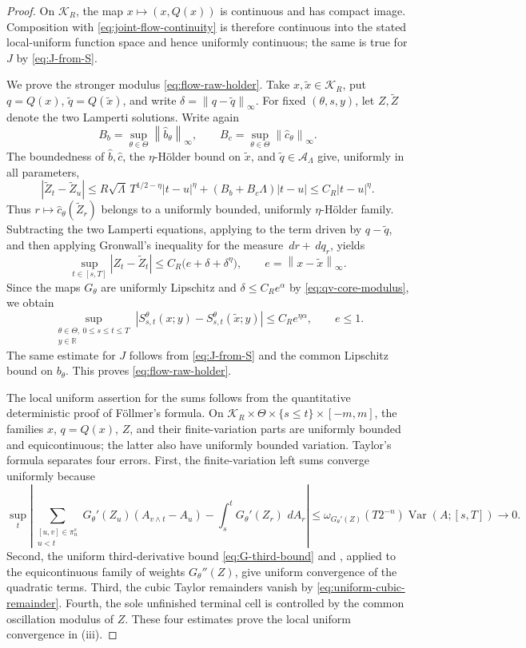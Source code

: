 \documentclass[10pt,a4paper]{amsart}
\newcommand{\R}{\mathbb R}
\newcommand{\Var}{\operatorname{Var}}
\newcommand{\abs}[1]{\left\lvert #1\right\rvert}
\newcommand{\cK}{\mathcal K}
\newcommand{\dd}{\,d}
\newcommand{\norm}[1]{\left\lVert #1\right\rVert}
\begin{document}
\begin{proof}
On \(\cK_R\), the map
\(x\mapsto(x,Q(x))\) is continuous and has compact image.  Composition with
\eqref{eq:joint-flow-continuity} is therefore continuous into the stated
local-uniform function space and hence uniformly continuous; the same is
true for \(J\) by \eqref{eq:J-from-S}.

We prove the stronger modulus \eqref{eq:flow-raw-holder}.  Take
\(x,\widetilde x\in\cK_R\), put
\(q=Q(x)\), \(\widetilde q=Q(\widetilde x)\), and write
\(\delta=\norm{q-\widetilde q}_\infty\).  For fixed
\((\theta,s,y)\), let \(Z,\widetilde Z\) denote the two Lamperti solutions.
Write again
\[
  B_b=\sup_{\theta\in\Theta}\norm{\widehat b_\theta}_\infty,
  \qquad
  B_c=\sup_{\theta\in\Theta}\norm{\widehat c_\theta}_\infty.
\]
The boundedness of \(\widehat b,\widehat c\), the \(\eta\)-H\"older bound on
\(\widetilde x\), and \(\widetilde q\in\mathcal A_\Lambda\) give, uniformly
in all parameters,
\[
  \abs{\widetilde Z_t-\widetilde Z_u}
  \le R\sqrt\Lambda\,T^{1/2-\eta}\abs{t-u}^\eta
      +(B_b+B_c\Lambda)\abs{t-u}
  \le C_R\abs{t-u}^\eta.
\]
Thus \(r\mapsto\widehat c_\theta(\widetilde Z_r)\) belongs to a uniformly
bounded, uniformly \(\eta\)-H\"older family.  Subtracting the two Lamperti
equations, applying  to the term driven by
\(q-\widetilde q\), and then applying Gronwall's inequality for the measure
\(\dd r+\dd q_r\), yields
\[
  \sup_{t\in[s,T]}\abs{Z_t-\widetilde Z_t}
  \le C_R\bigl(e+\delta+\delta^\eta\bigr),
  \qquad e=\norm{x-\widetilde x}_\infty.
\]
Since the maps \(G_\theta\) are uniformly Lipschitz and
\(\delta\le C_Re^\alpha\) by \eqref{eq:qv-core-modulus}, we obtain
\[
  \sup_{\substack{\theta\in\Theta,\ 0\le s\le t\le T\\y\in\R}}
  \abs{S_{s,t}^\theta(x;y)-S_{s,t}^\theta(\widetilde x;y)}
  \le C_Re^{\eta\alpha},
  \qquad e\le1.
\]
The same estimate for \(J\) follows from \eqref{eq:J-from-S} and the common
Lipschitz bound on \(b_\theta\).  This proves \eqref{eq:flow-raw-holder}.

The local uniform assertion for the sums follows
from the quantitative deterministic proof of F\"ollmer's formula.  On
\(\cK_R\times\Theta\times\{s\le t\}\times[-m,m]\), the families \(x\),
\(q=Q(x)\), \(Z\), and their finite-variation parts are uniformly bounded
and equicontinuous; the latter also have uniformly bounded variation.
Taylor's formula separates four errors.  First, the finite-variation left
sums converge uniformly because
\[
  \sup_t\left|
    \sum_{\substack{[u,v]\in\pi_n^s\\u<t}}
      G_\theta'(Z_u)(A_{v\wedge t}-A_u)
    -\int_s^tG_\theta'(Z_r)\,\dd A_r
  \right|
  \le
  \omega_{G_\theta'(Z)}(T2^{-n})\Var(A;[s,T])
  \longrightarrow0.
\]
Second, the uniform third-derivative bound
\eqref{eq:G-third-bound} and
, applied to the equicontinuous family of
weights \(G_\theta''(Z)\), give uniform convergence of the quadratic terms.
Third, the cubic Taylor remainders vanish by
\eqref{eq:uniform-cubic-remainder}.  Fourth, the sole unfinished terminal
cell is controlled by the common oscillation modulus of \(Z\).  These four
estimates prove the local uniform convergence in (iii).


\end{proof}
\end{document}
